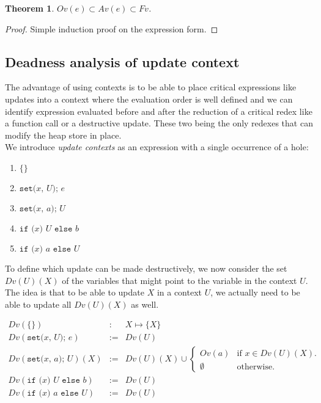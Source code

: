\documentclass[12pt,a4paper]{article}
\newcommand{\cl}[1]{\texttt{#1}}
\newtheorem{theorem}{Theorem}
\newcommand{\ucont}[1]{\{#1\}}
\begin{document}
\begin{theorem}
$Ov(e) \subset Av(e) \subset Fv$.
\end{theorem}
\begin{proof}
Simple induction proof on the expression form.
\end{proof}





\subsection{Deadness analysis of update context}

The advantage of using contexts is to be able to place critical expressions like updates into a context where the evaluation order is well defined and we can identify expression evaluated before and after the reduction of a critical redex like a function call or a destructive update. These two being the only redexes that can modify the heap store in place.\\

We introduce \emph{update contexts} as an expression with a single occurrence of a hole:
\begin{enumerate}
\itemsep-0.2em
\item $\ucont{}$
\item $\cl{set(} x \cl{, } U \cl{); } e $
\item $\cl{set(} x \cl{, } a \cl{); } U $
\item $ \cl{if (} x \cl{) } U \cl{ else } b $
\item $ \cl{if (} x \cl{) } a \cl{ else } U $
\end{enumerate}

To define which update can be made destructively, we now consider the set $Dv(U)(X)$ of the variables that might point to the variable in the context $U$. The idea is that to be able to update $X$ in a context $U$, we actually need to be able to update all $Dv(U)(X)$ as well.

\begin{eqnarray*}
Dv(\ucont{} ) &:& X \mapsto \{ X \} \\
Dv( \cl{set(} x \cl{, } U \cl{); } e ) &:=& Dv(U) \\
Dv( \cl{set(} x \cl{, } a \cl{); } U )(X) &:=& Dv(U)(X) \cup \left\lbrace \begin{array}{ll}
Ov(a) & \text{if $x \in Dv(U)(X)$.} \\
\emptyset & \text{otherwise.}
\end{array} \right. \\
Dv( \cl{if (} x \cl{) } U \cl{ else } b ) &:=& Dv(U) \\
Dv( \cl{if (} x \cl{) } a \cl{ else } U ) &:=& Dv(U) 
\end{eqnarray*}
\end{document}

